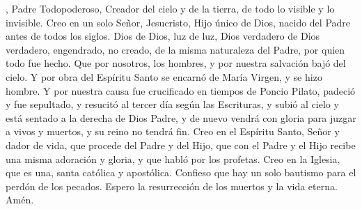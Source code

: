 , Padre Todopoderoso, Creador del cielo y de la tierra, de todo lo visible y lo invisible. 
Creo en un solo Señor, Jesucristo, Hijo único de Dios, nacido del Padre antes de todos los siglos. Dios de Dios, luz de luz, 
Dios verdadero de Dios verdadero, engendrado, no creado, de la misma naturaleza del Padre, por quien todo fue hecho. Que por nosotros, los hombres, 
y por nuestra salvación bajó del cielo. Y por obra del Espíritu Santo se encarnó de María Virgen, y se hizo hombre. 
Y por nuestra causa fue crucificado en tiempos de Poncio Pilato, padeció y fue sepultado, y resucitó al tercer día según las Escrituras, 
y subió al cielo y está sentado a la derecha de Dios Padre, y de nuevo vendrá con gloria para juzgar a vivos y muertos, y su reino no tendrá fin. 
Creo en el Espíritu Santo, Señor y dador de vida, que procede del Padre y del Hijo, que con el Padre y el Hijo recibe una misma adoración y gloria, 
y que habló por los profetas. Creo en la Iglesia, que es una, santa católica y apostólica. Confieso que hay un solo bautismo para el perdón de los pecados. 
Espero la resurrección de los muertos y la vida eterna. Amén.